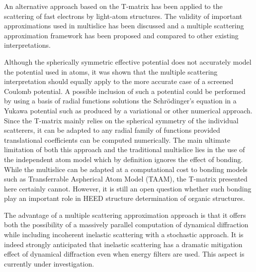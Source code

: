 An alternative approach based on the T-matrix has been applied to the
scattering of fast electrons by light-atom structures.
The validity of important approximations used in multislice has been
discussed and a multiple scattering approximation framework has been proposed
and compared to other existing interpretations.

Although the spherically symmetric effective potential does not accurately
model the potential used in atoms, it was shown that the multiple scattering
interpretation should equally apply to the more accurate case of a screened
Coulomb potential. A possible inclusion of such a potential could be performed
by using a basis of radial functions solutions the Schr{\"o}dinger's equation
in a Yukawa potential such as produced by a variational or other numerical approach.
Since the T-matrix mainly relies on the spherical symmetry of the individual
scatterers, it can be adapted to any radial family of functions provided translational
coefficients can be computed numerically.
The main ultimate limitation of both this approach and the traditional
multislice lies in the use of the independent atom model which by definition
ignores the effect of bonding. While the multislice can be adapted at a
computational cost to bonding models such as Transferrable Aspherical Atom
Model (TAAM), the T-matrix presented here certainly cannot.
However, it is still an open question whether such bonding play an
important role in HEED structure determination of organic structures.

The advantage of a multiple scattering approximation approach is that it offers
both the possibility of a massively parallel computation of dynamical diffraction
while including incoherent inelastic scattering with a stochastic approach.
It is indeed strongly anticipated that inelastic scattering has a dramatic
mitigation effect of dynamical diffraction even when energy filters are used.
This aspect is currently under investigation.
